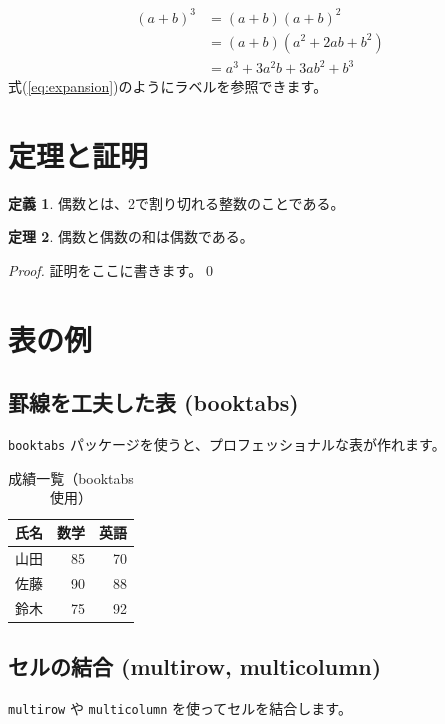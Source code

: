 \documentclass{ltjsarticle}
\theoremstyle{definition}
\newtheorem{theorem}{定理}
\newtheorem{definition}[theorem]{定義}
\begin{document}
\begin{align}
  (a+b)^3 &= (a+b)(a+b)^2 \\
          &= (a+b)(a^2 + 2ab + b^2) \\
          &= a^3 + 3a^2b + 3ab^2 + b^3 \label{eq:expansion}
\end{align}
式(\ref{eq:expansion})のようにラベルを参照できます。

\section{定理と証明}
\begin{definition}
  偶数とは、2で割り切れる整数のことである。
\end{definition}

\begin{theorem}
  偶数と偶数の和は偶数である。
\end{theorem}

\begin{proof}
  証明をここに書きます。\qed
\end{proof}

\section{表の例}

\subsection{罫線を工夫した表 (booktabs)}
\texttt{booktabs} パッケージを使うと、プロフェッショナルな表が作れます。

\begin{table}[htbp]
  \centering
  \caption{成績一覧（booktabs使用）}
  \begin{tabular}{lrr} \toprule
    氏名 & 数学 & 英語 \\ \midrule
    山田 & 85 & 70 \\
    佐藤 & 90 & 88 \\
    鈴木 & 75 & 92 \\ \bottomrule
  \end{tabular}
\end{table}

\subsection{セルの結合 (multirow, multicolumn)}
\texttt{multirow} や \texttt{multicolumn} を使ってセルを結合します。
\end{document}
